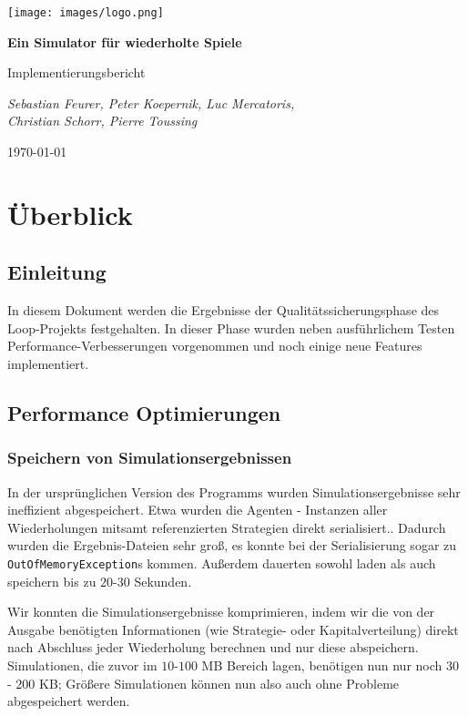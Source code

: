 \documentclass[parskip=full,11pt,openany]{scrreprt}
\begin{document}
\begin{titlepage}
	\centering
	\vspace*{5cm}
	\texttt{[image: images/logo.png]}\par
	{\huge\bfseries Ein Simulator für wiederholte Spiele\par}
	{\Large Implementierungsbericht\par}
	\vspace{2cm}
	{\Large\itshape Sebastian Feurer, Peter Koepernik, Luc Mercatoris,\\Christian Schorr, Pierre Toussing\par}
	\vfill
	{\large \today\par}
\end{titlepage}

\tableofcontents
\pagebreak

\chapter{Überblick}

\section{Einleitung}

In diesem Dokument werden die Ergebnisse der Qualitätssicherungsphase des Loop-Projekts festgehalten.
In dieser Phase wurden neben ausführlichem Testen Performance-Verbesserungen vorgenommen und noch einige neue Features implementiert.

\section{Performance Optimierungen}

\subsection{Speichern von Simulationsergebnissen}
In der ursprünglichen Version des Programms wurden Simulationsergebnisse sehr ineffizient abgespeichert. Etwa wurden die Agenten - Instanzen aller Wiederholungen mitsamt referenzierten Strategien direkt serialisiert.. Dadurch wurden die Ergebnis-Dateien sehr groß, es konnte bei der Serialisierung sogar zu \texttt{OutOfMemoryException}s kommen. Außerdem dauerten sowohl laden als auch speichern bis zu \(20\)-\(30\) Sekunden.

Wir konnten die Simulationsergebnisse komprimieren, indem wir die von der Ausgabe benötigten Informationen (wie Strategie- oder Kapitalverteilung) direkt nach Abschluss jeder Wiederholung berechnen und nur diese abspeichern. Simulationen, die zuvor im \(10\)-\(100\) MB Bereich lagen, benötigen nun nur noch \(30\) - \(200\) KB; Größere Simulationen können nun also auch ohne Probleme abgespeichert werden.
\end{document}
